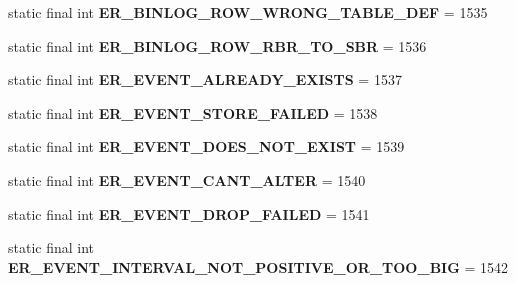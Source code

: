 \begin{DoxyCompactItemize}
static final int {\bfseries E\+R\+\_\+\+B\+I\+N\+L\+O\+G\+\_\+\+R\+O\+W\+\_\+\+W\+R\+O\+N\+G\+\_\+\+T\+A\+B\+L\+E\+\_\+\+D\+EF} = 1535
\item 
\mbox{\label{classcom_1_1mysql_1_1jdbc_1_1_mysql_error_numbers_ae80d774a953f1a6e7107475ee38aa568}} 
static final int {\bfseries E\+R\+\_\+\+B\+I\+N\+L\+O\+G\+\_\+\+R\+O\+W\+\_\+\+R\+B\+R\+\_\+\+T\+O\+\_\+\+S\+BR} = 1536
\item 
\mbox{\label{classcom_1_1mysql_1_1jdbc_1_1_mysql_error_numbers_afd26fef320bffd78b344443e669bd3b9}} 
static final int {\bfseries E\+R\+\_\+\+E\+V\+E\+N\+T\+\_\+\+A\+L\+R\+E\+A\+D\+Y\+\_\+\+E\+X\+I\+S\+TS} = 1537
\item 
\mbox{\label{classcom_1_1mysql_1_1jdbc_1_1_mysql_error_numbers_aa0ac61a2e78797d8b79e9d4d83fdefcd}} 
static final int {\bfseries E\+R\+\_\+\+E\+V\+E\+N\+T\+\_\+\+S\+T\+O\+R\+E\+\_\+\+F\+A\+I\+L\+ED} = 1538
\item 
\mbox{\label{classcom_1_1mysql_1_1jdbc_1_1_mysql_error_numbers_a6c45de745895714800b18f02144385b2}} 
static final int {\bfseries E\+R\+\_\+\+E\+V\+E\+N\+T\+\_\+\+D\+O\+E\+S\+\_\+\+N\+O\+T\+\_\+\+E\+X\+I\+ST} = 1539
\item 
\mbox{\label{classcom_1_1mysql_1_1jdbc_1_1_mysql_error_numbers_a0331354bf0e4713d2f6ce849a37f3470}} 
static final int {\bfseries E\+R\+\_\+\+E\+V\+E\+N\+T\+\_\+\+C\+A\+N\+T\+\_\+\+A\+L\+T\+ER} = 1540
\item 
\mbox{\label{classcom_1_1mysql_1_1jdbc_1_1_mysql_error_numbers_a76059a8d0a192bf1fad400e22c0c185c}} 
static final int {\bfseries E\+R\+\_\+\+E\+V\+E\+N\+T\+\_\+\+D\+R\+O\+P\+\_\+\+F\+A\+I\+L\+ED} = 1541
\item 
\mbox{\label{classcom_1_1mysql_1_1jdbc_1_1_mysql_error_numbers_afccf0c54195c850dfe150000dd771472}} 
static final int {\bfseries E\+R\+\_\+\+E\+V\+E\+N\+T\+\_\+\+I\+N\+T\+E\+R\+V\+A\+L\+\_\+\+N\+O\+T\+\_\+\+P\+O\+S\+I\+T\+I\+V\+E\+\_\+\+O\+R\+\_\+\+T\+O\+O\+\_\+\+B\+IG} = 1542

\end{DoxyCompactItemize}
